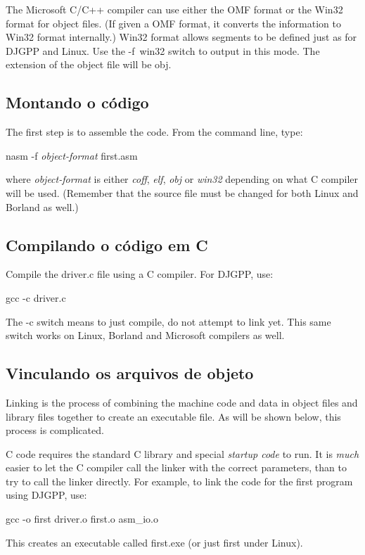 {The Microsoft C/C++  compiler can use either
the OMF format or the Win32 format for object files. (If given a OMF
format, it converts the information to Win32 format internally.) Win32
format allows segments to be defined just as for DJGPP and Linux. Use
the {\code -f~win32} switch to output in this mode. The extension of
the object file will be {\code obj}.

\subsection{Montando o código}

The first step is to assemble the code. From the command line, type:
\begin{CodeQuote}
nasm -f {\em object-format} first.asm
\end{CodeQuote}
where {\em object-format} is either {\em coff\/}, {\em elf\/}, {\em obj} or
{\em win32} depending on what C compiler will be used. (Remember that the
source file must be changed for both Linux and Borland as well.)


\subsection{Compilando o código em C}

Compile the {\code driver.c} file using a C compiler. For DJGPP, use:
\begin{CodeQuote}
gcc -c driver.c
\end{CodeQuote}
The {\code -c} switch means to just compile, do not attempt to link yet. This
same switch works on Linux, Borland and Microsoft compilers as well.

\subsection{Vinculando os arquivos de objeto \label{seq:vinculando} }

Linking is the process of combining the machine code and data in
object files and library files together to create an executable
file. As will be shown below, this process is complicated.

C code requires the standard C library and special \emph{startup code}
 to run.  It is \emph{much} easier to let the C
compiler call the linker with the correct parameters, than to try to
call the linker directly. For example, to link the code for the first
program using DJGPP,  use:
\begin{CodeQuote}
gcc -o first driver.o first.o asm\_io.o
\end{CodeQuote}
This creates an executable called {\code first.exe} (or just {\code first}
under Linux).

}
